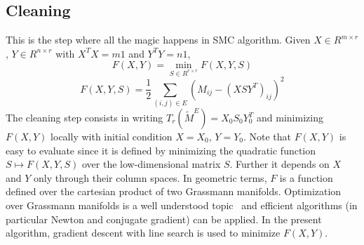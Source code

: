 \subsection{Cleaning}
This is the step where all the magic happens in SMC algorithm. Given $X \in R^{m\times r}$, $Y \in R^{n\times r}$ with $X^TX = m1$ and $Y^TY = n1$, 
\begin{equation}
F(X,Y) = \min_{S \in R^{r \times r}} F(X,Y,S)
\end{equation}
\begin{equation}
F(X,Y,S) = \frac{1}{2} \sum\limits_{(i,j) \in E} (M_{ij} - (XSY^T)_{ij})^2
\end{equation}
The cleaning step consists in writing $T_r(\widetilde{M}^E) = X_0S_0Y_0^T$ and minimizing $F(X, Y)$ locally with initial
condition $X = X_0$, $Y = Y_0$. Note that $F(X, Y)$ is easy to evaluate since it is defined by minimizing the quadratic function
$S \mapsto F(X, Y, S)$ over the low-dimensional matrix $S$. Further it depends on $X$ and $Y$ only through
their column spaces. In geometric terms, $F$ is a function defined over the cartesian product of two Grassmann manifolds. Optimization over Grassmann manifolds is a well understood topic~\cite{edelman1998geometry} and efficient algorithms (in particular Newton and conjugate gradient) can be applied. In the present algorithm, gradient descent with line search is used to minimize $F(X, Y)$.
